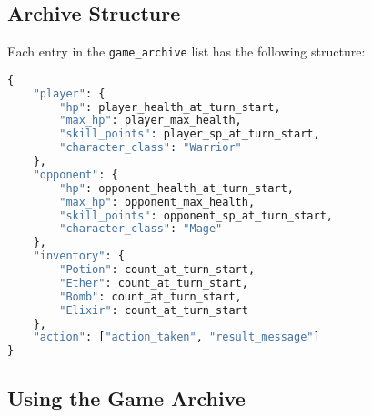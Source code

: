 \documentclass[12pt]{article}
\begin{document}
\subsection{Archive Structure}
Each entry in the \texttt{game\_archive} list has the following structure:

\begin{lstlisting}[language=Python, caption=Game Archive Entry Structure]
{
    "player": {
        "hp": player_health_at_turn_start,
        "max_hp": player_max_health,
        "skill_points": player_sp_at_turn_start,
        "character_class": "Warrior"
    },
    "opponent": {
        "hp": opponent_health_at_turn_start,
        "max_hp": opponent_max_health,
        "skill_points": opponent_sp_at_turn_start,
        "character_class": "Mage"
    },
    "inventory": {
        "Potion": count_at_turn_start,
        "Ether": count_at_turn_start,
        "Bomb": count_at_turn_start,
        "Elixir": count_at_turn_start
    },
    "action": ["action_taken", "result_message"]
}
\end{lstlisting}

 \subsection{Using the Game Archive}
% 
%         
%         
%     
\end{document}
